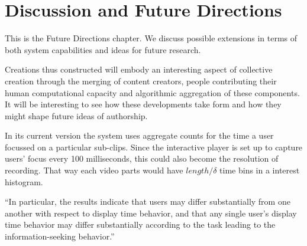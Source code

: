\chapter{Discussion and Future Directions}
\label{ch:discussion}

 

This is the Future Directions chapter. We discuss possible extensions in terms of both system capabilities and ideas for future research.

Creations thus constructed will embody an interesting aspect of collective creation through the merging of content creators, people contributing their human computational capacity and algorithmic aggregation of these components. It will be interesting to see how these developments take form and how they might shape future ideas of authorship.


In its current version the system uses aggregate counts for the time a user focussed on a particular sub-clips. Since the interactive player is set up to capture users' focus every 100 milliseconds, this could also become the resolution of recording. That way each video parts would have $length/\delta$ time bins in a interest histogram.



``In particular, the results indicate that users may differ substantially from one another with respect to display time behavior, and that any single user’s display time behavior may differ substantially according to the task leading to the information-seeking behavior.''\cite{Kelly:2004tq}
